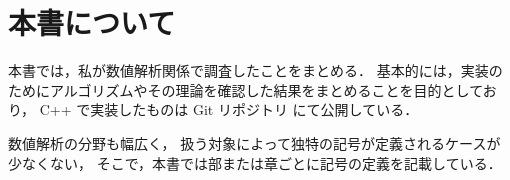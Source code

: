 %

\chapter{本書について}

本書では，私が数値解析関係で調査したことをまとめる．
基本的には，実装のためにアルゴリズムやその理論を確認した結果をまとめることを目的としており，
C++ で実装したものは Git リポジトリ \cite{NumericalCollectionCpp} にて公開している．

数値解析の分野も幅広く，
扱う対象によって独特の記号が定義されるケースが少なくない，
そこで，本書では部または章ごとに記号の定義を記載している．
